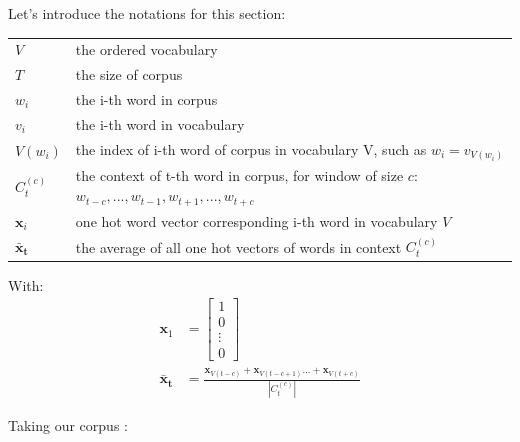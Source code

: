 Let's introduce the notations for this section:

{\ttfamily
\begin{table}[H]
    \centering
    \begin{tabular}{ll}
        \toprule
        $V$       	   	 &    the ordered vocabulary \\
        $T$    		   	 &    the size of corpus \\
        $w_i$          	 &    the i-th word in corpus \\
        $v_{i}$          	 &    the i-th word in vocabulary \\
        $V(w_i)$       &    the index of i-th word of corpus in vocabulary V, such as $ w_{i} = v_{V(w_i)}$\\
        $C_t^{(c)}$      &    the context of t-th word in corpus, for window of size $c$: $w_{t-c}, ..., w_{t-1}, w_{t+1}, ... ,w_{t+c}$\\
		$\mathbf{x}_i$ 				& one hot word vector corresponding i-th word in vocabulary $V$ \\
        $\mathbf{\bar x_t}$ 	& the average of all one hot vectors of words in context $C_t^{(c)}$ \\
        \bottomrule
    \end{tabular}
\end{table}
}

With:
\begin{align}
	\mathbf{x}_1 &= 
	\begin{bmatrix} 
		1 \\
		0 \\
		\vdots\\
		0
	\end{bmatrix} \\
	\mathbf{\bar x_t} &= \frac{\mathbf{x}_{V(t-c)} + \mathbf{x}_{V(t-c+1)} ... + \mathbf{x}_{V(t+c)}}{|C_t^{(c)}|}
\end{align}

Taking our corpus :

